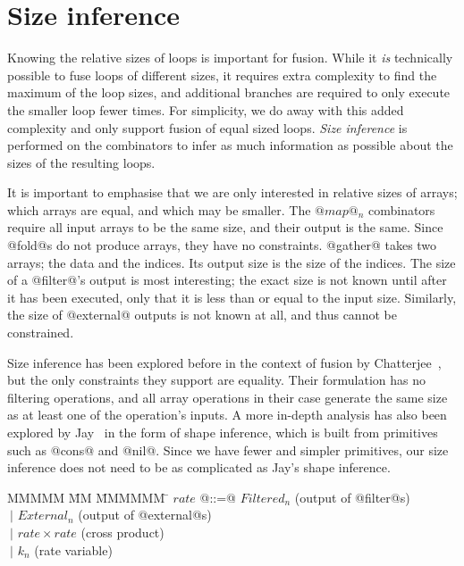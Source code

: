 \section{Size inference}





Knowing the relative sizes of loops is important for fusion.
While it \emph{is} technically possible to fuse loops of different sizes, it requires extra complexity to find the maximum of the loop sizes, and additional branches are required to only execute the smaller loop fewer times.
For simplicity, we do away with this added complexity and only support fusion of equal sized loops.
\emph{Size inference} is performed on the combinators to infer as much information as possible about the sizes of the resulting loops.

It is important to emphasise that we are only interested in relative sizes of arrays; which arrays are equal, and which may be smaller.
The $@map@_n$ combinators require all input arrays to be the same size, and their output is the same.
Since @fold@s do not produce arrays, they have no constraints.
@gather@ takes two arrays; the data and the indices. Its output size is the size of the indices.
The size of a @filter@'s output is most interesting; the exact size is not known until after it has been executed, only that it is less than or equal to the input size.
Similarly, the size of @external@ outputs is not known at all, and thus cannot be constrained.

Size inference has been explored before in the context of fusion by Chatterjee~\cite{chatterjee1991size}, but the only constraints they support are equality.
Their formulation has no filtering operations, and all array operations in their case generate the same size as at least one of the operation's inputs.
A more in-depth analysis has also been explored by Jay~\cite{jay1996shape} in the form of shape inference, which is built from primitives such as @cons@ and @nil@.
Since we have fewer and simpler primitives, our size inference does not need to be as complicated as Jay's shape inference.


\begin{tabbing}
MMMMM       \= MM \= MMMMMM \= \kill
$rate$      \> @::=@ \> $Filtered_n$        \> (output of @filter@s) \\
            \> $~|$  \> $External_n$        \> (output of @external@s) \\
            \> $~|$  \> $rate \times rate$  \> (cross product) \\
            \> $~|$  \> $k_n$               \> (rate variable)\\
\end{tabbing}


